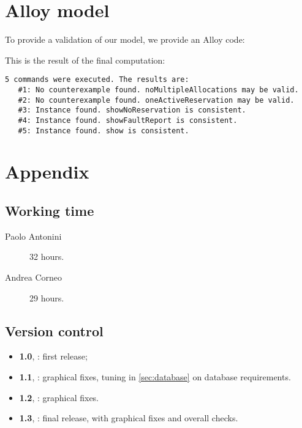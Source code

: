 \chapter{Alloy model}\label{chap:appendix}

To provide a validation of our model, we provide an Alloy code:



This is the result of the final computation:

\begin{Verbatim}[fontsize=\small]
5 commands were executed. The results are:
   #1: No counterexample found. noMultipleAllocations may be valid.
   #2: No counterexample found. oneActiveReservation may be valid.
   #3: Instance found. showNoReservation is consistent.
   #4: Instance found. showFaultReport is consistent.
   #5: Instance found. show is consistent.
\end{Verbatim} 




\backmatter %

\chapter{Appendix}

\section*{Working time}

\begin{description}
	\item [Paolo Antonini] 32 hours.
	\item [Andrea Corneo] 29 hours.
\end{description}


\section*{Version control}
\begin{itemize}
	\item \textbf{1.0}, : first release;
	\item \textbf{1.1}, : graphical fixes, tuning in \cref{sec:database} on database requirements. 
	\item \textbf{1.2}, : graphical fixes.
	\item \textbf{1.3}, : final release, with graphical fixes and overall checks.
\end{itemize}